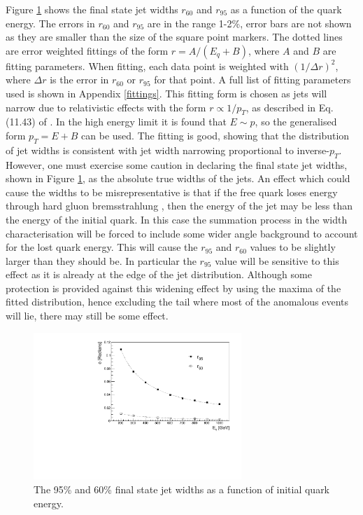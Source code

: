 \documentclass[a4paper,11pt, onecolumn]{article}
\begin{document}
  Figure \ref{r q} shows the final state jet widths $r_{60}$ and $r_{95}$ as a function of the quark energy. The errors
  in $r_{60}$ and $r_{95}$ are in the range 1-2\%, error bars are not shown as they are smaller than the size of the square point markers.
  The dotted lines are error weighted fittings of the form $r = A/(E_{q}+B)$, where $A$ and $B$ are fitting parameters. When fitting, each
  data point is weighted with $(1/\Delta r)^2$, where $\Delta r$ is the error in $r_{60}$ or $r_{95}$ for that point. A full list of fitting 
  parameters used is shown in Appendix \ref{fittings}. This fitting form is chosen as jets will narrow due to relativistic effects with the form
  $r \propto 1/p_T$, as described in Eq. (11.43) of \cite{HalzenMartin}. In the high energy limit it is found that $E \sim p$, 
  so the generalised form $p_T = E + B$ can be used. The fitting is good, showing that the distribution of jet widths is consistent with jet width 
  narrowing proportional to inverse-$p_T$. \\
  
  However, one must exercise some caution in declaring the final state jet widths, shown in Figure \ref{r q}, as the absolute true widths of the jets. 
  An effect which could cause the widths to be misrepresentative is that if the free quark loses energy through hard gluon bremsstrahlung \cite{gluonbrem},
  then the energy of the jet may be less than the energy of the initial quark. In this case
  the summation process in the width characterisation will be forced to include some wider angle background to account for the lost quark energy.
  This will cause the $r_{95}$ and $r_{60}$ values to be slightly larger than they should be. In particular the $r_{95}$ value will be sensitive to this
  effect as it is already at the edge of the jet distribution. Although some protection is provided against this widening effect by using the maxima of 
  the fitted distribution, hence excluding the tail where most of the anomalous events will lie, there may still be some effect. \\


  \begin{figure}[!htb]
    \begin{center}
      \includegraphics[width = 0.7\textwidth]{r_q.pdf}
      \caption{The 95\% and 60\% final state jet widths as a function of initial quark energy. \vspace{-0.5cm}}
      \label{r q}
    \end{center}
  \end{figure}
\end{document}
